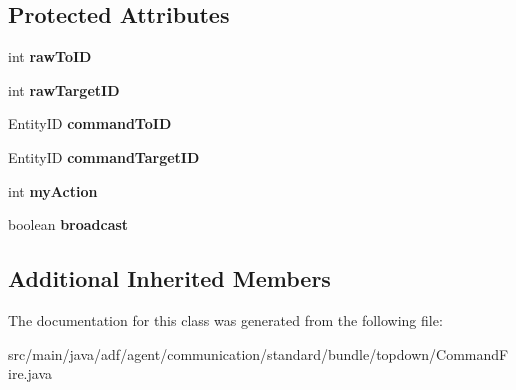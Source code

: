 \subsection*{Protected Attributes}
\begin{DoxyCompactItemize}
\item 
\hypertarget{classadf_1_1agent_1_1communication_1_1standard_1_1bundle_1_1topdown_1_1CommandFire_a9dc1206054fe357c2d4f70f56ed4317d}{}\label{classadf_1_1agent_1_1communication_1_1standard_1_1bundle_1_1topdown_1_1CommandFire_a9dc1206054fe357c2d4f70f56ed4317d} 
int {\bfseries raw\+To\+ID}
\item 
\hypertarget{classadf_1_1agent_1_1communication_1_1standard_1_1bundle_1_1topdown_1_1CommandFire_a0aa5fc09c19fca117a0f56ecff606e9b}{}\label{classadf_1_1agent_1_1communication_1_1standard_1_1bundle_1_1topdown_1_1CommandFire_a0aa5fc09c19fca117a0f56ecff606e9b} 
int {\bfseries raw\+Target\+ID}
\item 
\hypertarget{classadf_1_1agent_1_1communication_1_1standard_1_1bundle_1_1topdown_1_1CommandFire_a7638a069bac5b762afe9124c052b5e56}{}\label{classadf_1_1agent_1_1communication_1_1standard_1_1bundle_1_1topdown_1_1CommandFire_a7638a069bac5b762afe9124c052b5e56} 
Entity\+ID {\bfseries command\+To\+ID}
\item 
\hypertarget{classadf_1_1agent_1_1communication_1_1standard_1_1bundle_1_1topdown_1_1CommandFire_abfb8caea8fbc5dee3b0369e74fdb4be6}{}\label{classadf_1_1agent_1_1communication_1_1standard_1_1bundle_1_1topdown_1_1CommandFire_abfb8caea8fbc5dee3b0369e74fdb4be6} 
Entity\+ID {\bfseries command\+Target\+ID}
\item 
\hypertarget{classadf_1_1agent_1_1communication_1_1standard_1_1bundle_1_1topdown_1_1CommandFire_a37ec07982370fe310434d3b50d368b8a}{}\label{classadf_1_1agent_1_1communication_1_1standard_1_1bundle_1_1topdown_1_1CommandFire_a37ec07982370fe310434d3b50d368b8a} 
int {\bfseries my\+Action}
\item 
\hypertarget{classadf_1_1agent_1_1communication_1_1standard_1_1bundle_1_1topdown_1_1CommandFire_a46eb557d1d645390bc21d02676adbd59}{}\label{classadf_1_1agent_1_1communication_1_1standard_1_1bundle_1_1topdown_1_1CommandFire_a46eb557d1d645390bc21d02676adbd59} 
boolean {\bfseries broadcast}
\end{DoxyCompactItemize}
\subsection*{Additional Inherited Members}


The documentation for this class was generated from the following file\+:\begin{DoxyCompactItemize}
\item 
src/main/java/adf/agent/communication/standard/bundle/topdown/Command\+Fire.\+java\end{DoxyCompactItemize}
